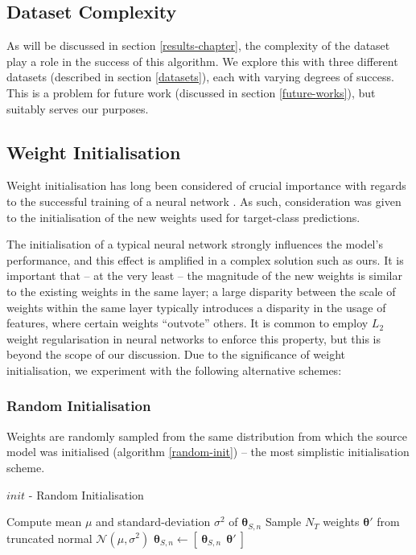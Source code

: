 \documentclass{report}
\begin{document}
\subsection{Dataset Complexity}
As will be discussed in section \ref{results-chapter}, the complexity of the dataset play a role in the success of this algorithm. We explore this with three different datasets (described in section \ref{datasets}), each with varying degrees of success. This is a problem for future work (discussed in section \ref{future-works}), but suitably serves our purposes. \par

\subsection{Weight Initialisation} \label{weight-init}
Weight initialisation has long been considered of crucial importance with regards to the successful training of a neural network \parencite{heinit}\parencite{weightinit}. As such, consideration was given to the initialisation of the new weights used for target-class predictions. \par
The initialisation of a typical neural network strongly influences the model's performance, and this effect is amplified in a complex solution such as ours. It is important that -- at the very least -- the magnitude of the new weights is similar to the existing weights in the same layer; a large disparity between the scale of weights within the same layer typically introduces a disparity in the usage of features, where certain weights ``outvote'' others. It is common to employ $L_2$ weight regularisation in neural networks to enforce this property, but this is beyond the scope of our discussion. Due to the significance of weight initialisation, we experiment with the following alternative schemes:

\subsubsection{Random Initialisation}
Weights are randomly sampled from the same distribution from which the source model was initialised (algorithm \ref{random-init}) -- the most simplistic initialisation scheme.
\begin{algorithm}[h!]
	\label{alg:random-init}
	\caption{$init$ - Random Initialisation }
	\label{random-init}
	\begin{algorithmic}[1]
		\State Compute mean $\mu$ and standard-deviation $\sigma^2$ of $\bm{\theta}_{S,n}$
		\State Sample $N_T$ weights $\bm{\theta}'$ from truncated normal $\mathcal{N}(\mu, \sigma^2)$
		\State $\bm{\theta}_{S,n} \gets [~ \bm{\theta}_{S,n}~ ~ \bm{\theta}'~ ]$
	\end{algorithmic}
\end{algorithm}
\end{document}
